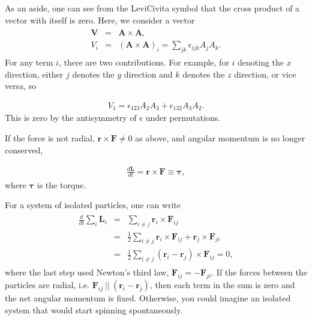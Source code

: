 \documentclass[letterpaper,10pt,english]{sphinxmanual}
\begin{document}
As an aside, one can see from the Levi\sphinxhyphen{}Civita symbol that the cross
product of a vector with itself is zero. Here, we consider a vector
\begin{equation*}
\begin{split}
\begin{eqnarray}
\boldsymbol{V}&=&\boldsymbol{A}\times\boldsymbol{A},\\
\nonumber
V_i&=&(\boldsymbol{A}\times\boldsymbol{A})_i=\sum_{jk}\epsilon_{ijk}A_jA_k.
\end{eqnarray}
\end{split}
\end{equation*}
For any term \(i\), there are two contributions. For example, for \(i\)
denoting the \(x\) direction, either \(j\) denotes the \(y\) direction and
\(k\) denotes the \(z\) direction, or vice versa, so




\begin{equation*}
\begin{split}
\begin{equation}
V_1=\epsilon_{123}A_2A_3+\epsilon_{132}A_3A_2.
\label{_auto11} \tag{11}
\end{equation}
\end{split}
\end{equation*}
This is zero by the antisymmetry of \(\epsilon\) under permutations.

If the force is not radial, \(\boldsymbol{r}\times\boldsymbol{F}\ne 0\) as above, and angular momentum is no longer conserved,




\begin{equation*}
\begin{split}
\begin{equation}
\frac{d\boldsymbol{L}}{dt}=\boldsymbol{r}\times\boldsymbol{F}\equiv\boldsymbol{\tau},
\label{_auto12} \tag{12}
\end{equation}
\end{split}
\end{equation*}
where \(\boldsymbol{\tau}\) is the torque.

For a system of isolated particles, one can write
\begin{equation*}
\begin{split}
\begin{eqnarray}
\frac{d}{dt}\sum_i\boldsymbol{L}_i&=&\sum_{i\ne j}\boldsymbol{r}_i\times \boldsymbol{F}_{ij}\\
\nonumber
&=&\frac{1}{2}\sum_{i\ne j} \boldsymbol{r}_i\times \boldsymbol{F}_{ij}+\boldsymbol{r}_j\times\boldsymbol{F}_{ji}\\
\nonumber
&=&\frac{1}{2}\sum_{i\ne j} (\boldsymbol{r}_i-\boldsymbol{r}_j)\times\boldsymbol{F}_{ij}=0,
\end{eqnarray}
\end{split}
\end{equation*}
where the last step used Newton’s third law,
\(\boldsymbol{F}_{ij}=-\boldsymbol{F}_{ji}\). If the forces between the particles are
radial, i.e. \(\boldsymbol{F}_{ij} ~||~ (\boldsymbol{r}_i-\boldsymbol{r}_j)\), then each term in
the sum is zero and the net angular momentum is fixed. Otherwise, you
could imagine an isolated system that would start spinning
spontaneously.
\end{document}
